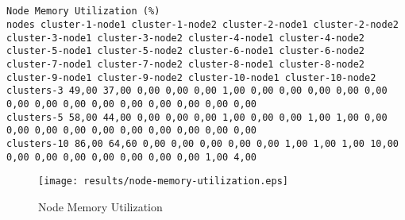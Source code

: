 \documentclass{elsart}
\begin{document}
\subsection{}

\begin{lstlisting}[caption={Node Memory Utilization}]
Node Memory Utilization (%)
nodes cluster-1-node1 cluster-1-node2 cluster-2-node1 cluster-2-node2 cluster-3-node1 cluster-3-node2 cluster-4-node1 cluster-4-node2 cluster-5-node1 cluster-5-node2 cluster-6-node1 cluster-6-node2 cluster-7-node1 cluster-7-node2 cluster-8-node1 cluster-8-node2 cluster-9-node1 cluster-9-node2 cluster-10-node1 cluster-10-node2
clusters-3 49,00 37,00 0,00 0,00 0,00 1,00 0,00 0,00 0,00 0,00 0,00 0,00 0,00 0,00 0,00 0,00 0,00 0,00 0,00 0,00
clusters-5 58,00 44,00 0,00 0,00 0,00 1,00 0,00 0,00 1,00 1,00 0,00 0,00 0,00 0,00 0,00 0,00 0,00 0,00 0,00 0,00
clusters-10 86,00 64,60 0,00 0,00 0,00 0,00 0,00 1,00 1,00 1,00 10,00 0,00 0,00 0,00 0,00 0,00 0,00 0,00 1,00 4,00
\end{lstlisting}

\begin{figure}[ht]
\centering
\texttt{[image: results/node-memory-utilization.eps]}
\caption{Node Memory Utilization}\label{fig:node-memory-utilization.eps}
\end{figure}
\end{document}
